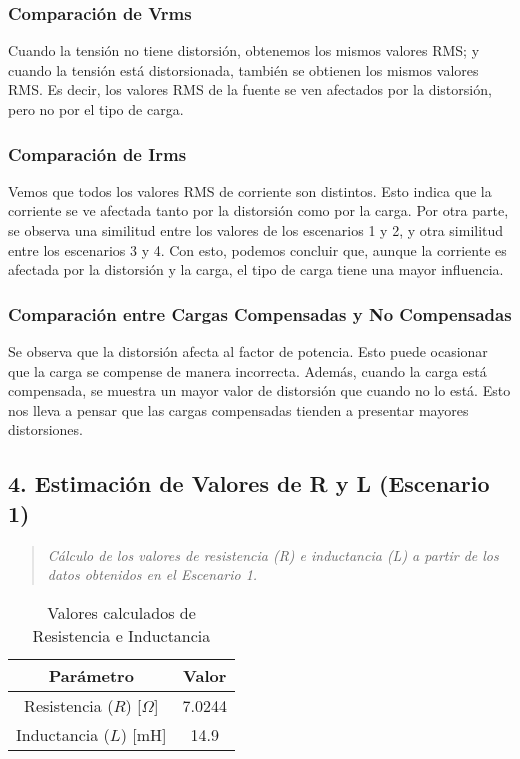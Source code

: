 \documentclass[conference]{IEEEtran}
\theoremstyle{mytheoremstyle}
\theoremstyle{mytheoremstyle}
\theoremstyle{myproblemstyle}
\begin{document}
        \subsubsection{Comparación de Vrms}
        Cuando la tensión no tiene distorsión, obtenemos los mismos valores RMS; y cuando la tensión está distorsionada, también se obtienen los mismos valores RMS. Es decir, los valores RMS de la fuente se ven afectados por la distorsión, pero no por el tipo de carga.

        \subsubsection{Comparación de Irms}

        Vemos que todos los valores RMS de corriente son distintos. Esto indica que la corriente se ve afectada tanto por la distorsión como por la carga. Por otra parte, se observa una similitud entre los valores de los escenarios 1 y 2, y otra similitud entre los escenarios 3 y 4. Con esto, podemos concluir que, aunque la corriente es afectada por la distorsión y la carga, el tipo de carga tiene una mayor influencia.

        \subsubsection{Comparación entre Cargas Compensadas y No Compensadas}

        Se observa que la distorsión afecta al factor de potencia. Esto puede ocasionar que la carga se compense de manera incorrecta. Además, cuando la carga está compensada, se muestra un mayor valor de distorsión que cuando no lo está. Esto nos lleva a pensar que las cargas compensadas tienden a presentar mayores distorsiones.


        \subsection{4. Estimación de Valores de R y L (Escenario 1)}
        \begin{quote}
        \textit{Cálculo de los valores de resistencia (R) e inductancia (L) a partir de los datos obtenidos en el Escenario 1.}
        \end{quote}
        \begin{table}[h!]
            \centering
            \caption{Valores calculados de Resistencia e Inductancia}
            \label{tabla_resistencia_inductancia}
            \begin{tabular}{cc}
            \toprule
            \textbf{Parámetro} & \textbf{Valor} \\
            \midrule
            Resistencia (\(R\)) [\(\Omega\)] & 7.0244 \\
            Inductancia (\(L\)) [mH]          & 14.9 \\
            \bottomrule
            \end{tabular}
            \end{table}
\end{document}
